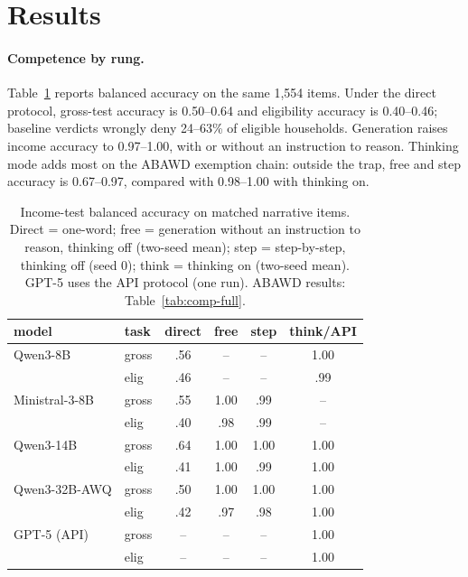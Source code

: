 \documentclass[11pt]{article}
\begin{document}
\section{Results}\label{sec:results}
\paragraph{Competence by rung.} Table~\ref{tab:comp} reports balanced accuracy on the same 1,554 items. Under the direct protocol, gross-test accuracy is 0.50--0.64 and eligibility accuracy is 0.40--0.46; baseline verdicts wrongly deny 24--63\% of eligible households. Generation raises income accuracy to 0.97--1.00, with or without an instruction to reason. Thinking mode adds most on the ABAWD exemption chain: outside the trap, free and step accuracy is 0.67--0.97, compared with 0.98--1.00 with thinking on.

\begin{table}[t]\centering\footnotesize\setlength{\tabcolsep}{2pt}
\begin{tabular}{llcccc}
\toprule
model & task & direct & free & step & think/API \\
\midrule
Qwen3-8B & gross & .56 & -- & -- & 1.00 \\
 & elig & .46 & -- & -- & .99 \\
Ministral-3-8B & gross & .55 & 1.00 & .99 & -- \\
 & elig & .40 & .98 & .99 & -- \\
Qwen3-14B & gross & .64 & 1.00 & 1.00 & 1.00 \\
 & elig & .41 & 1.00 & .99 & 1.00 \\
Qwen3-32B-AWQ & gross & .50 & 1.00 & 1.00 & 1.00 \\
 & elig & .42 & .97 & .98 & 1.00 \\
GPT-5 (API) & gross & -- & -- & -- & 1.00 \\
 & elig & -- & -- & -- & 1.00 \\
\bottomrule
\end{tabular}
\caption{Income-test balanced accuracy on matched narrative items. Direct = one-word; free = generation without an instruction to reason, thinking off (two-seed mean); step = step-by-step, thinking off (seed 0); think = thinking on (two-seed mean). GPT-5 uses the API protocol (one run). ABAWD results: Table~\ref{tab:comp-full}.}
\label{tab:comp}
\end{table}
\end{document}
